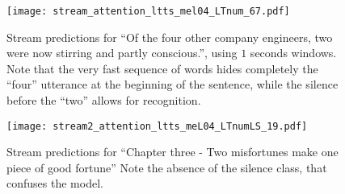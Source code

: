 \begin{figure}[h!]
    \centering
    \texttt{[image: stream\_attention\_ltts\_mel04\_LTnum\_67.pdf]}
    \caption{Stream predictions for
        ``Of the four other company engineers, two were now stirring and partly conscious.'',
        using $1$ seconds windows.
        Note that the very fast sequence of words hides completely the ``four''
        utterance at the beginning of the sentence, while the silence before
        the ``two'' allows for recognition.
    }%
    \label{fig:stream_attention_ltts_mel04_LTnum_67}
\end{figure}

\begin{figure}[h!]
    \centering
    \texttt{[image: stream2\_attention\_ltts\_meL04\_LTnumLS\_19.pdf]}
    \caption{Stream predictions for
        ``Chapter three - Two misfortunes make one piece of good fortune''
        Note the absence of the silence class, that confuses the model.
    }%
    \label{fig:stream_attention_ltts_meL04_LTnumLS_19}
\end{figure}




